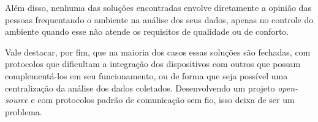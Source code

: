 \documentclass[../monografia.tex]{subfiles}
\begin{document}
Além disso, nenhuma das soluções encontradas envolve diretamente a opinião das pessoas frequentando o ambiente na análise dos seus dados, apenas no controle do ambiente quando esse não atende os requisitos de qualidade ou de conforto. 

Vale destacar, por fim, que na maioria dos casos essas soluções são fechadas, com protocolos que dificultam a integração dos dispositivos com outros que possam complementá-los em seu funcionamento, ou de forma que seja possível uma centralização da análise dos dados coletados. Desenvolvendo um projeto \textit{open-source} e com protocolos padrão de comunicação sem fio, isso deixa de ser um problema. 
\end{document}
